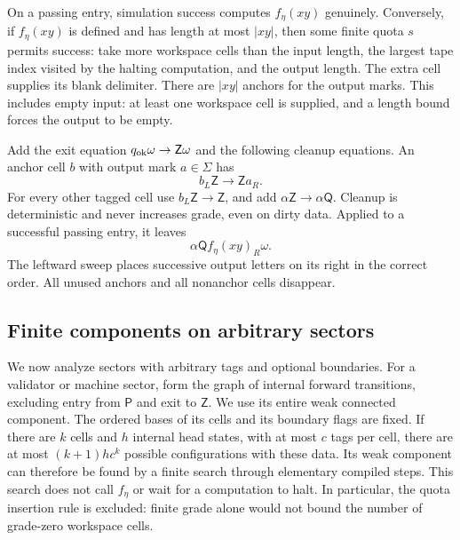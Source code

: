 On a passing entry, simulation success computes $f_\eta(xy)$ genuinely.
Conversely, if $f_\eta(xy)$ is defined and has length at most $|xy|$,
then some finite quota $s$ permits success: take more workspace cells
than the input length, the largest tape index visited by the halting
computation, and the output length. The extra cell supplies its blank
delimiter. There are $|xy|$ anchors for the output marks. This includes
empty input: at least one workspace cell is supplied, and a length bound
forces the output to be empty.

Add the exit equation $q_{\rm ok}\omega\to\mathsf Z\omega$ and the
following cleanup equations. An anchor cell $b$ with output mark
$a\in\Sigma$ has
\begin{equation}\label{eq:compiler-cleanup}
b_L\mathsf Z\longrightarrow\mathsf Z a_R.
\end{equation}
For every other tagged cell use $b_L\mathsf Z\to\mathsf Z$, and add
$\alpha\mathsf Z\to\alpha\mathsf Q$. Cleanup is deterministic and
never increases grade, even on dirty data. Applied to a successful
passing entry, it leaves
\begin{equation}\label{eq:compiler-success}
\alpha\mathsf Q f_\eta(xy)_R\omega.
\end{equation}
The leftward sweep places successive output letters on its right in the
correct order. All unused anchors and all nonanchor cells disappear.

\subsection{Finite components on arbitrary sectors}

We now analyze sectors with arbitrary tags and optional boundaries.
For a validator or machine sector, form the graph of internal forward
transitions, excluding entry from $\mathsf P$ and exit to $\mathsf Z$.
We use its entire weak connected component. The ordered bases of its
cells and its boundary flags are fixed. If there are $k$ cells and $h$
internal head states, with at most $c$ tags per cell, there are at most
$(k+1)h c^k$ possible configurations with these data. Its weak component
can therefore be found by a finite search through elementary compiled
steps. This search does not call $f_\eta$ or wait for a computation to
halt. In particular, the quota insertion rule is excluded: finite grade
alone would not bound the number of grade-zero workspace cells.

